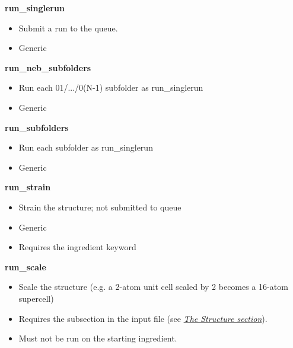 \documentclass[letterpaper,10pt,english]{sphinxmanual}
\begin{document}
\textbf{run\_singlerun}
\begin{itemize}
\item {} 
Submit a run to the queue.

\item {} 
Generic

\end{itemize}

\textbf{run\_neb\_subfolders}
\begin{itemize}
\item {} 
Run each 01/.../0(N-1) subfolder as run\_singlerun

\item {} 
Generic

\end{itemize}

\textbf{run\_subfolders}
\begin{itemize}
\item {} 
Run each subfolder as run\_singlerun

\item {} 
Generic

\end{itemize}

\textbf{run\_strain}
\begin{itemize}
\item {} 
Strain the structure; not submitted to queue

\item {} 
Generic

\item {} 
Requires the  ingredient keyword

\end{itemize}

\textbf{run\_scale}
\begin{itemize}
\item {} 
Scale the structure (e.g. a 2-atom unit cell scaled by 2 becomes a 16-atom supercell)

\item {} 
Requires the  subsection in the input file (see {\hyperref[3_1_1_structure::doc]{\emph{The Structure section}}}).

\item {} 
Must not be run on the starting ingredient.

\end{itemize}
\end{document}
